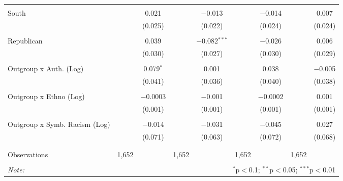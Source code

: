 \begin{table}[H]
{\begin{tabular}{@{\extracolsep{5pt}}lcccccccc}
  & & & & & & & & \\ 
 South &  & 0.021 &  & $-$0.013 &  & $-$0.014 &  & 0.007 \\ 
  &  & (0.025) &  & (0.022) &  & (0.024) &  & (0.024) \\ 
  & & & & & & & & \\ 
 Republican &  & 0.039 &  & $-$0.082$^{***}$ &  & $-$0.026 &  & 0.006 \\ 
  &  & (0.030) &  & (0.027) &  & (0.030) &  & (0.029) \\ 
  & & & & & & & & \\ 
 Outgroup x Auth. (Log) &  & 0.079$^{*}$ &  & 0.001 &  & 0.038 &  & $-$0.005 \\ 
  &  & (0.041) &  & (0.036) &  & (0.040) &  & (0.038) \\ 
  & & & & & & & & \\ 
 Outgroup x Ethno (Log) &  & $-$0.0003 &  & $-$0.001 &  & $-$0.0002 &  & 0.001 \\ 
  &  & (0.001) &  & (0.001) &  & (0.001) &  & (0.001) \\ 
  & & & & & & & & \\ 
 Outgroup x Symb. Racism (Log) &  & $-$0.014 &  & $-$0.031 &  & $-$0.045 &  & 0.027 \\ 
  &  & (0.071) &  & (0.063) &  & (0.072) &  & (0.068) \\ 
  & & & & & & & & \\ 
\hline \\[-1.8ex] 
Observations & 1,652 &  & 1,652 &  & 1,652 &  & 1,652 &  \\ 
\hline 
\hline \\[-1.8ex] 
\textit{Note:}  & \multicolumn{8}{r}{$^{*}$p$<$0.1; $^{**}$p$<$0.05; $^{***}$p$<$0.01} \\ 
\end{tabular}} 
\end{table} 
